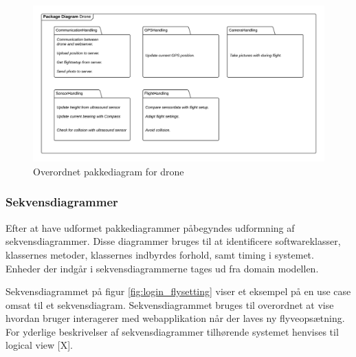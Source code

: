 \begin{figure}[H]
	\centering
	\includegraphics[width=1\textwidth]{Billeder/Projektbeskrivelse/Packagediagram_drone}
	\vspace{-0.9cm}	
	\caption{Overordnet pakkediagram for drone}
	\label{fig:package_drone}
\end{figure}

\newpage

\subsubsection*{Sekvensdiagrammer}
\vspace{-0.3cm}	

Efter at have udformet pakkediagrammer påbegyndes udformning af sekvensdiagrammer. Disse diagrammer bruges til at identificere softwareklasser, klassernes metoder, klassernes indbyrdes forhold, samt timing i systemet. Enheder der indgår i sekvensdiagrammerne tages ud fra domain modellen. 

Sekvensdiagrammet på figur \ref{fig:login_flysetting} viser et eksempel på en use case omsat til et sekvensdiagram. Sekvensdiagrammet bruges til overordnet at vise hvordan bruger interagerer med webapplikation når der laves ny flyveopsætning. For yderlige beskrivelser af sekvensdiagrammer tilhørende systemet henvises til logical view [X].


